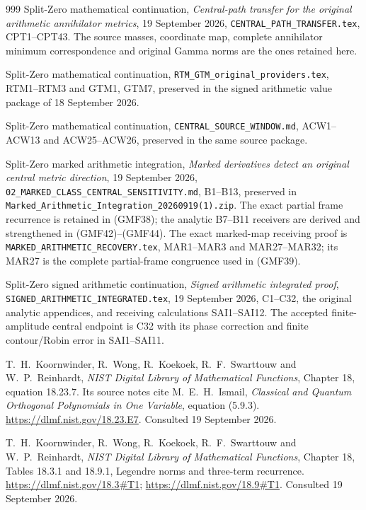 \documentclass[11pt,a4paper]{article}
\begin{document}
\begin{thebibliography}{999}
Split-Zero mathematical continuation,
\emph{Central-path transfer for the original arithmetic
annihilator metrics}, 19 September 2026,
\texttt{CENTRAL\_PATH\_TRANSFER.tex}, CPT1--CPT43.
The source masses, coordinate map, complete annihilator
minimum correspondence and original Gamma norms are the
ones retained here.

Split-Zero mathematical continuation,
\texttt{RTM\_GTM\_original\_providers.tex},
RTM1--RTM3 and GTM1, GTM7, preserved in the signed arithmetic
value package of 18 September 2026.

Split-Zero mathematical continuation,
\texttt{CENTRAL\_SOURCE\_WINDOW.md}, ACW1--ACW13 and
ACW25--ACW26, preserved in the same source package.

Split-Zero marked arithmetic integration,
\emph{Marked derivatives detect an original central metric
direction}, 19 September 2026,
\texttt{02\_MARKED\_CLASS\_CENTRAL\_SENSITIVITY.md},
B1--B13, preserved in
\texttt{Marked\_Arithmetic\_Integration\_20260919(1).zip}.
The exact partial frame recurrence is retained in (GMF38);
the analytic B7--B11 receivers are derived and strengthened
in (GMF42)--(GMF44).
The exact marked-map receiving proof is
\texttt{MARKED\_ARITHMETIC\_RECOVERY.tex},
MAR1--MAR3 and MAR27--MAR32; its MAR27 is the complete
partial-frame congruence used in (GMF39).

Split-Zero signed arithmetic continuation,
\emph{Signed arithmetic integrated proof},
\texttt{SIGNED\_ARITHMETIC\_INTEGRATED.tex},
19 September 2026, C1--C32, the original analytic
appendices, and receiving calculations SAI1--SAI12.
The accepted finite-amplitude central endpoint is C32
with its phase correction and finite contour/Robin
error in SAI1--SAI11.

T.\ H.\ Koornwinder, R.\ Wong, R.\ Koekoek,
R.\ F.\ Swarttouw and W.\ P.\ Reinhardt,
\emph{NIST Digital Library of Mathematical Functions},
Chapter 18, equation 18.23.7.
Its source notes cite M.\ E.\ H.\ Ismail,
\emph{Classical and Quantum Orthogonal Polynomials in One
Variable}, equation (5.9.3).
\url{https://dlmf.nist.gov/18.23.E7}.
Consulted 19 September 2026.

T.\ H.\ Koornwinder, R.\ Wong, R.\ Koekoek,
R.\ F.\ Swarttouw and W.\ P.\ Reinhardt,
\emph{NIST Digital Library of Mathematical Functions},
Chapter 18, Tables 18.3.1 and 18.9.1,
Legendre norms and three-term recurrence.
\url{https://dlmf.nist.gov/18.3#T1};
\url{https://dlmf.nist.gov/18.9#T1}.
Consulted 19 September 2026.


\end{thebibliography}
\end{document}
